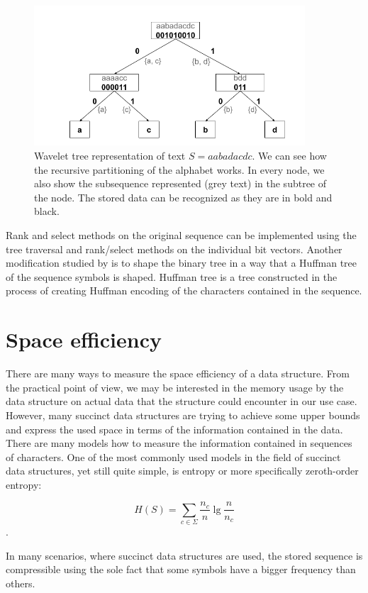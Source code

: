 \begin{figure}
	\centerline{
		\includegraphics[width=0.9\textwidth, height=0.3\textheight]{images/wavelet_tree}
	}
	\caption[TODO]{Wavelet tree representation of text $S=\mathit{aabadacdc}$. We can see how
	the recursive partitioning of the alphabet works. In every node, we also show the
	subsequence represented (grey text) in the subtree of the node. The stored data can be
	recognized as they are in bold and black.
	}
	\label{obr:WaveletTreeExample}
\end{figure}

Rank and select methods on the original sequence can be implemented using the tree
traversal and rank/select methods on the individual bit vectors. Another modification
studied by \cite{makinen2005succinct} is to shape the binary tree in a way that a Huffman
tree of the sequence symbols is shaped. Huffman tree is a tree constructed in the
process of creating Huffman encoding of the characters contained in the sequence.

\section{Space efficiency}

There are many ways to measure the space efficiency of a data structure. From the
practical point of view, we may be interested in the memory usage by the data
structure on actual data that the structure could encounter in our use case. However,
many succinct data structures are trying to achieve some upper bounds and express
the used space in terms of the information contained in the data. There are many
models how to measure the information contained in sequences of characters. One
of the most commonly used models in the field of succinct data structures, yet still
quite simple, is entropy or more specifically zeroth-order entropy:

$$H(S)=\sum_{c\in\Sigma} \frac{n_c}{n} \lg \frac{n}{n_c}$$.

In many scenarios, where succinct data structures are used, the stored sequence
is compressible using the sole fact that some symbols have a bigger frequency than others.